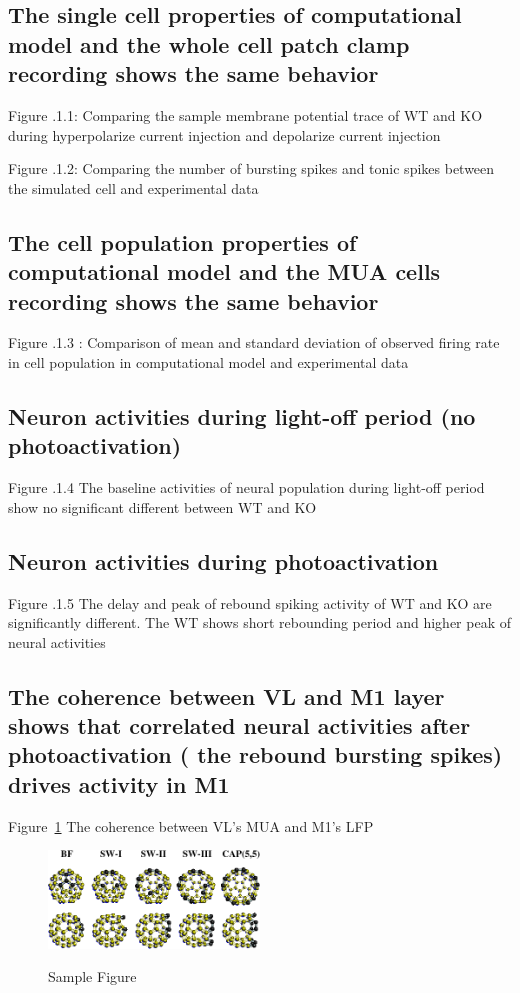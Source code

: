 \subsection{ The single cell properties of computational model and the whole cell patch clamp recording shows the same behavior}

Figure .1.1: Comparing the sample membrane potential trace of WT and KO during hyperpolarize current injection and depolarize current injection

Figure .1.2: Comparing the number of bursting spikes and tonic spikes between the simulated cell and experimental data


\subsection{  The cell population properties of computational model and the MUA cells recording shows the same behavior}

Figure .1.3 : Comparison of mean and standard deviation of observed firing rate in cell population in computational model and experimental data


\subsection{ Neuron activities during light-off period (no photoactivation)}

Figure .1.4 The baseline activities of neural population during light-off period show no significant different between WT and KO


\subsection{ Neuron activities during photoactivation}

Figure .1.5 The delay and peak of rebound spiking activity of WT and KO are significantly different. The WT shows short rebounding period and higher peak of neural activities


\subsection{ The coherence between VL and M1 layer shows that correlated neural activities after photoactivation ( the rebound bursting spikes) drives activity in M1}

Figure~\ref{fig:sample} The coherence between VL’s MUA and M1’s LFP

\begin{figure}
	\centering
	\includegraphics[width=0.5\textwidth]{figures/sample-fig1}
	\label{fig:sample}
	\caption{Sample Figure}
\end{figure}

